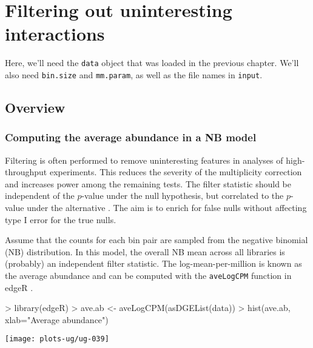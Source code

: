 \documentclass[12pt]{report}
\renewenvironment{Schunk}{\vspace{0pt}}{\vspace{0pt}}
\newcommand{\edgeR}{edgeR}
\newcommand{\code}[1]{{\small\texttt{#1}}}
\newenvironment{combox}
{ \begin{shaded}\begin{center}\begin{minipage}[t]{0.95\textwidth} }
{ \end{minipage}\end{center}\end{shaded} }
\begin{document}

\chapter{Filtering out uninteresting interactions}
\label{chap:filter}

\begin{combox}
Here, we'll need the \code{data} object that was loaded in the previous chapter.
We'll also need \code{bin.size} and \code{mm.param}, as well as the file names in \code{input}.
\end{combox}

\section{Overview}

\subsection{Computing the average abundance in a NB model}
Filtering is often performed to remove uninteresting features in analyses of high-throughput experiments. 
This reduces the severity of the multiplicity correction and increases power among the remaining tests. 
The filter statistic should be independent of the $p$-value under the null hypothesis, but correlated to the $p$-value under the alternative \citep{bourgon2010independent}. 
The aim is to enrich for false nulls without affecting type I error for the true nulls.

Assume that the counts for each bin pair are sampled from the negative binomial (NB) distribution.
In this model, the overall NB mean across all libraries is (probably) an independent filter statistic.
The log-mean-per-million is known as the average abundance and can be computed with the \code{aveLogCPM} function in \edgeR{} \citep{mccarthy2012glm}.

\begin{Schunk}
\begin{Sinput}
> library(edgeR)
> ave.ab <- aveLogCPM(asDGEList(data))
> hist(ave.ab, xlab="Average abundance")
\end{Sinput}
\end{Schunk}

\begin{center}
\texttt{[image: plots-ug/ug-039]}
\end{center}
\end{document}
